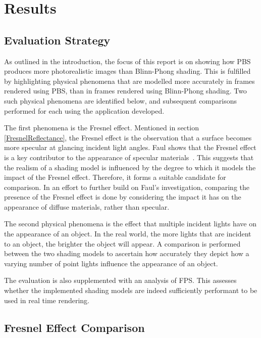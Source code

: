 \chapter{Results}
\label{chapter3}

\section{Evaluation Strategy}

As outlined in the introduction, the focus of this report is on showing how PBS produces more photorealistic images than Blinn-Phong shading. This is fulfilled by highlighting physical phenomena that are modelled more accurately in frames rendered using PBS, than in frames rendered using Blinn-Phong shading. Two such physical phenomena are identified below, and subsequent comparisons performed for each using the application developed.

The first phenomena is the Fresnel effect. Mentioned in section \ref{FresnelReflectance}, the Fresnel effect is the observation that a surface becomes more specular at glancing incident light angles. Faul shows that the Fresnel effect is a key contributor to the appearance of specular materials~\cite{FaulInfluenceOfFresnelEffect}. This suggests that the realism of a shading model is influenced by the degree to which it models the impact of the Fresnel effect. Therefore, it forms a suitable candidate for comparison. In an effort to further build on Faul's investigation, comparing the presence of the Fresnel effect is done by considering the impact it has on the appearance of diffuse materials, rather than specular.

The second physical phenomena is the effect that multiple incident lights have on the appearance of an object. In the real world, the more lights that are incident to an object, the brighter the object will appear. A comparison is performed between the two shading models to ascertain how accurately they depict how a varying number of point lights influence the appearance of an object.

The evaluation is also supplemented with an analysis of FPS. This assesses whether the implemented shading models are indeed sufficiently performant to be used in real time rendering.

\section{Fresnel Effect Comparison}

